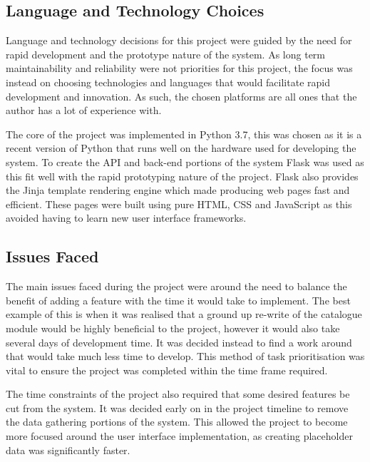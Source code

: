 \documentclass[12pt,titlepage]{article}
\begin{document}
  \subsection{Language and Technology Choices}

  Language and technology decisions for this project were guided by the need for
  rapid development and the prototype nature of the system. As long term
  maintainability and reliability were not priorities for this project, the
  focus was instead on choosing technologies and languages that would facilitate
  rapid development and innovation. As such, the chosen platforms are all ones
  that the author has a lot of experience with.

  The core of the project was implemented in Python 3.7, this was chosen as it
  is a recent version of Python that runs well on the hardware used for
  developing the system. To create the API and back-end portions of the system
  Flask was used as this fit well with the rapid prototyping nature of the
  project. Flask also provides the Jinja template rendering engine which made
  producing web pages fast and efficient. These pages were built using pure
  HTML, CSS and JavaScript as this avoided having to learn new user interface
  frameworks.


  \subsection{Issues Faced}

  The main issues faced during the project were around the need to balance the
  benefit of adding a feature with the time it would take to implement. The best
  example of this is when it was realised that a ground up re-write of the
  catalogue module would be highly beneficial to the project, however it would
  also take several days of development time. It was decided instead to find a
  work around that would take much less time to develop. This method of task
  prioritisation was vital to ensure the project was completed within the
  time frame required.

  The time constraints of the project also required that some desired features
  be cut from the system. It was decided early on in the project timeline to
  remove the data gathering portions of the system. This allowed the project to
  become more focused around the user interface implementation, as creating
  placeholder data was significantly faster.
\end{document}
